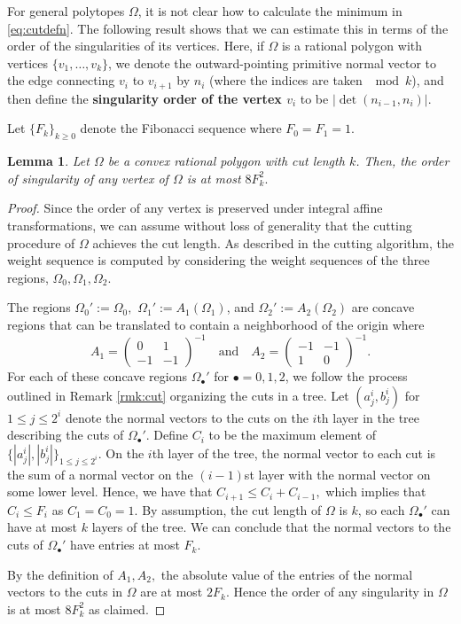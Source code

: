 \documentclass[11pt, reqno]{amsart}
\newtheorem{lemma}[thm]{Lemma}
\theoremstyle{remark}
\numberwithin{equation}{subsection}
\numberwithin{figure}{section}
\theoremstyle{customremark}
\newcommand{\Om}{{\Omega}}
\begin{document}
For general polytopes $\Om$, it is not
clear 
how to calculate the minimum in \eqref{eq:cutdefn}.  The following result shows that we can estimate this in terms of
the order of the singularities of its vertices. Here, if $\Omega$ is a rational polygon with vertices $\{v_1,\hdots,v_k\}$, we  denote the outward-pointing primitive normal vector to the edge connecting $v_i$ to $v_{i+1}$ by $n_i$ (where the indices are taken $\mod k$),
and then define the {\bf singularity order of the vertex $v_i$} to be $|\det(n_{i-1},n_{i})|.$ 
 

Let $\{F_k\}_{k\geq 0}$ denote the Fibonacci sequence where $F_0=F_1=1.$

\begin{lemma} \label{lem:cutBound}
    Let $\Omega$ be a convex rational polygon with cut length $k$. Then, the order of singularity of any vertex of $\Omega$ is at most $8F_k^2.$
\end{lemma}
\begin{proof}
Since the order of any vertex is preserved under integral affine transformations, 
we can assume    without loss of generality that  the cutting procedure of $\Omega$ achieves the cut length.   As described in the cutting algorithm, the weight sequence is computed by considering the weight sequences of the three regions, $\Omega_0,\Omega_1,\Omega_2$. 

    The regions $\Omega_0':=\Omega_0,$ $\Omega_1':=A_1(\Omega_1)$, and $\Omega_2':=A_2(\Omega_2)$ are concave regions that can be translated to contain a neighborhood of the origin where \[A_1=\begin{pmatrix}
        0 & 1 \\ -1 & -1
    \end{pmatrix}^{-1} \quad \text{and} \quad A_2=\begin{pmatrix}
        -1 & -1 \\ 1 & 0 
    \end{pmatrix}^{-1}.\] 
 For each of these concave regions $\Omega_\bullet'$ for $\bullet=0,1,2$, we follow the process outlined in Remark \ref{rmk:cut} organizing the cuts in a tree. Let $(a_j^i,b_j^i)$ for $1 \leq j \leq 2^i$ denote the normal vectors to the cuts on the $i$th layer in the tree describing the cuts of $\Omega_\bullet'$. Define $C_i$ to be the maximum element of $\{|a_j^i|,|b_j^i|\}_{1 \leq j \leq 2^i}$. On the $i$th layer of the tree, the normal vector to each cut is the sum of a normal vector on the $(i-1)$st layer with the normal vector on some lower level. Hence, we have that  $C_{i+1} \leq C_i +C_{i-1},$ which implies that $C_i \leq F_i$ as $C_1=C_0=1.$ By assumption, the cut length of $\Omega$ is $k$, so each $\Omega_\bullet'$ can have at most $k$ layers of the tree. We can conclude that the normal vectors to the cuts of $\Omega_\bullet'$ have entries at most $F_k.$

    By the definition of $A_1,A_2,$ the absolute value of the entries of the normal vectors to the cuts in $\Omega$ are at most $2F_k.$
    Hence   the order of any singularity in $\Omega$ is at most $8F_k^2$ as claimed. 
\end{proof}
\end{document}
